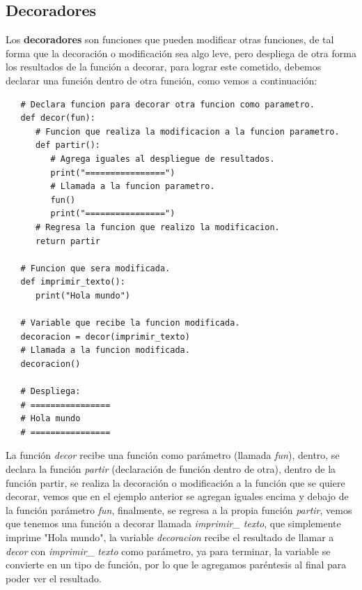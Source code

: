 \subsection{Decoradores}
\hspace{0.55cm}Los \textbf{decoradores} son funciones que pueden modificar otras funciones, de tal forma que la decoración o modificación sea algo leve, pero despliega de otra forma los resultados de la función a decorar, para lograr este cometido, debemos declarar una función dentro de otra función, como vemos a continuación:
\begin{lstlisting}
   # Declara funcion para decorar otra funcion como parametro.
   def decor(fun):
      # Funcion que realiza la modificacion a la funcion parametro.
      def partir():
         # Agrega iguales al despliegue de resultados.
         print("================")
         # Llamada a la funcion parametro.
         fun()
         print("================")
      # Regresa la funcion que realizo la modificacion.
      return partir
      
   # Funcion que sera modificada.
   def imprimir_texto():
      print("Hola mundo")
   
   # Variable que recibe la funcion modificada.
   decoracion = decor(imprimir_texto)
   # Llamada a la funcion modificada.
   decoracion()
   
   # Despliega:
   # ================
   # Hola mundo
   # ================
\end{lstlisting}

La función \textit{decor} recibe una función como parámetro (llamada \textit{fun}), dentro, se declara la función \textit{partir} (declaración de función dentro de otra), dentro de la función partir, se realiza la decoración o modificación a la función que se quiere decorar, vemos que en el ejemplo anterior se agregan iguales encima y debajo de la función parámetro \textit{fun}, finalmente, se regresa a la propia función \textit{partir}, vemos que tenemos una función a decorar llamada \textit{imprimir\_ texto}, que simplemente imprime "Hola mundo", la variable \textit{decoracion} recibe el resultado de llamar a \textit{decor} con \textit{imprimir\_ texto} como parámetro, ya para terminar, la variable se convierte en un tipo de función, por lo que le agregamos paréntesis al final para poder ver el resultado.

